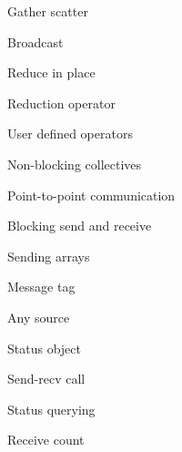 \documentclass[11pt,headernav]{beamer}
\begin{document}
\begin{frame}[containsverbatim]{Gather scatter}
  
\end{frame}
\begin{frame}[containsverbatim]{Broadcast}
  
\end{frame}
\begin{frame}[containsverbatim]{Reduce in place}
  \footnotesize
  
\end{frame}
\begin{frame}[containsverbatim]{Reduction operator}
  
\end{frame}
\begin{frame}[containsverbatim]{User defined operators}
  
\end{frame}
\begin{frame}[containsverbatim]{Non-blocking collectives}
  
\end{frame}

 {Point-to-point communication}

\begin{frame}[containsverbatim]{Blocking send and receive}
  
\end{frame}
\begin{frame}[containsverbatim]{Sending arrays}
  
\end{frame}
\begin{frame}[containsverbatim]{Message tag}
  
\end{frame}
\begin{frame}[containsverbatim]{Any source}
  
\end{frame}
\begin{frame}[containsverbatim]{Status object}
  
\end{frame}
\begin{frame}[containsverbatim]{Send-recv call}
  
\end{frame}
\begin{frame}[containsverbatim]{Status querying}
  
\end{frame}

\begin{frame}[containsverbatim]{Receive count}
  
\end{frame}
\end{document}
